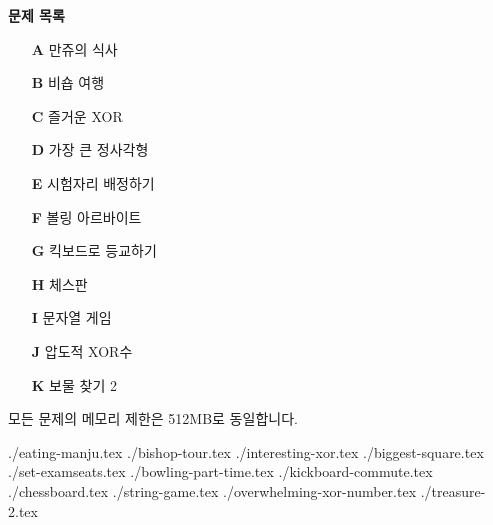 \documentclass[10pt,a4paper,oneside,dvipsnames]{article}
\newcommand{\importproblem}[1]{{./#1.tex}}
\begin{document}
\BuildContestTitle

\raggedbottom

\begin{center}
    \textbf{\Large\textsf{문제 목록}}
\end{center}


\begin{center}
    \begin{minipage}{0.35\textwidth}
        \begin{itemize}
            
	\item[\textbf{A}] 만쥬의 식사
	\item[\textbf{B}] 비숍 여행
	\item[\textbf{C}] 즐거운 XOR
	\item[\textbf{D}] 가장 큰 정사각형
	\item[\textbf{E}] 시험자리 배정하기
	\item[\textbf{F}] 볼링 아르바이트
	\item[\textbf{G}] 킥보드로 등교하기
	\item[\textbf{H}] 체스판
	\item[\textbf{I}] 문자열 게임
	\item[\textbf{J}] 압도적 XOR수
	\item[\textbf{K}] 보물 찾기 2


        \end{itemize}    
    \end{minipage}
\end{center}

모든 문제의 메모리 제한은 512MB로 동일합니다.
\newpage

\importproblem{eating-manju} %
\importproblem{bishop-tour} %
\importproblem{interesting-xor} %
\importproblem{biggest-square} %
\importproblem{set-examseats} %
\importproblem{bowling-part-time} %
\importproblem{kickboard-commute} %
\importproblem{chessboard} %
\importproblem{string-game} %
\importproblem{overwhelming-xor-number} %
\importproblem{treasure-2} %
\end{document}
